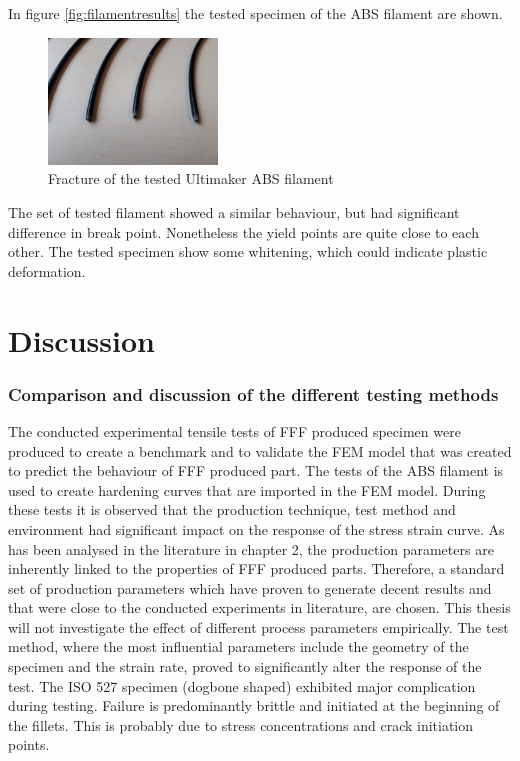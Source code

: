 In figure \ref{fig:filamentresults} the tested specimen of the ABS filament are shown.
\begin{figure}[H]
    \centering
    \includegraphics[width=0.40\textwidth]{chapter_5_Experimentaltesting/figures/Imagefilament.jpg}
    \caption{Fracture of the tested Ultimaker ABS filament}
    \label{fig:filamentspecimen}
\end{figure}
The set of tested filament showed a similar behaviour, but had significant difference in break point. Nonetheless the yield points are quite close to each other. The tested specimen show some whitening, which could indicate plastic deformation.  

\section{Discussion}
\subsubsection{Comparison and discussion of the different testing methods}
The conducted experimental tensile tests of FFF produced specimen were produced to create a benchmark and to validate the FEM model that was created to predict the behaviour of FFF produced part. The tests of the ABS filament is used to create hardening curves that are imported in the FEM model.
During these tests it is observed that the production technique, test method and environment had significant impact on the response of the stress strain curve. As has been analysed in the literature in chapter 2, the production parameters are inherently linked to the properties of FFF produced parts. Therefore, a standard set of production parameters which have proven to generate decent results and that were close to the conducted experiments in literature, are chosen. This thesis will not investigate the effect of different process parameters empirically. The test method, where the most influential  parameters include the geometry of the specimen and the strain rate, proved to significantly alter the response of the test. The ISO 527 specimen (dogbone shaped) exhibited major complication during testing. Failure is predominantly brittle and initiated at the beginning of the fillets. This is probably due to stress concentrations and crack initiation points. 


